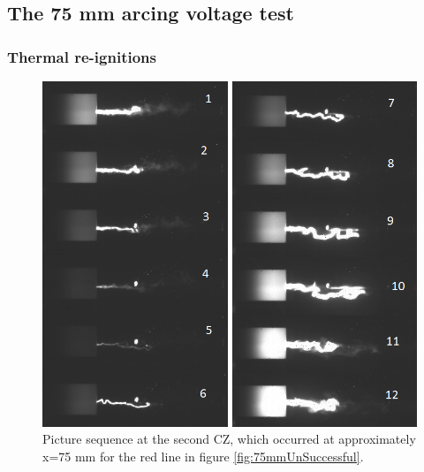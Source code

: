 \documentclass[10pt,b5paper,twoside]{article}
\begin{document}
\subsection{The 75 mm arcing voltage test} \label{app:pictureSeq75mm}
\subsubsection{Thermal re-ignitions}
\begin{figure}[H]
\centering
\includegraphics[scale=0.7, angle =0 ]{Bilder/Results/073_75_TR_TR.png}
\caption{Picture sequence at the second CZ, which occurred at approximately  x=75 mm for the red line in figure \ref{fig:75mmUnSuccessful}.} \label{fig:arcingVoltage_test_73_red}
\end{figure}

%
\end{document}
